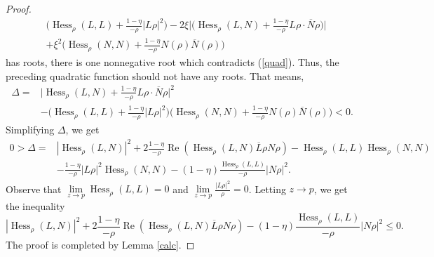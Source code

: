 \documentclass[11pt]{article}
\theoremstyle{plain} \numberwithin{equation}{section}
\theoremstyle{definition}
\DeclareMathOperator{\Hessian}{Hess}
\renewcommand{\Re}{\operatorname{Re}}
\begin{document}
\begin{proof}
\[\begin{split}
	&\Big(\Hessian_\rho (L, L)+\frac{1-\eta}{-\rho}|L\rho|^2\Big)-2\xi\Big|\Big(\Hessian_\rho (L, N)+\frac{1-\eta}{-\rho}L\rho\cdot\overline{N}\rho\Big)\Big|\\&+\xi^2 \Big(\Hessian_\rho (N, N)+\frac{1-\eta}{-\rho}N(\rho)\overline{N} (\rho)\Big)
	\end{split}\] has roots, there is one nonnegative root which contradicts (\ref{quad}). Thus, the preceding quadratic function should not have any roots. That means,
	\[\begin{split}
	\Delta=&\Big|\Hessian_\rho (L, N)+\frac{1-\eta}{-\rho}L\rho\cdot\overline{N}\rho\Big|^2\\&-\Big(\Hessian_\rho (L, L)+\frac{1-\eta}{-\rho}|L\rho|^2\Big)\Big(\Hessian_\rho (N, N)+\frac{1-\eta}{-\rho}N(\rho)\overline{N} (\rho)\Big)<0.
	\end{split}\]
	Simplifying $\Delta$, we get \[\begin{split}
	0>\Delta=&|\Hessian_\rho(L, N)|^2+2\frac{1-\eta}{-\rho}\Re\left(\Hessian_\rho(L, N)\overline{L}\rho N\rho\right)-\Hessian_\rho(L, L)\Hessian_\rho(N, N)\\&-\frac{1-\eta}{-\rho}|L\rho|^2\Hessian_\rho(N, N)-(1-\eta)\frac{\Hessian_\rho(L, L)}{-\rho}|N\rho|^2.
	\end{split}\]
	Observe that $\lim\limits_{z\to p}\Hessian_\rho(L, L)=0$ and $\lim\limits_{z\to p}\frac{|L\rho|^2}{\rho}=0$. Letting $z\rightarrow p$, we get the inequality
	\[|\Hessian_\rho(L, N)|^2+2\frac{1-\eta}{-\rho}\Re\left(\Hessian_\rho(L, N)\overline{L}\rho N\rho\right)-(1-\eta)\frac{\Hessian_\rho(L, L)}{-\rho}|N\rho|^2\leq 0.\] The proof is completed by Lemma \ref{calc}.
\end{proof}
\end{document}
